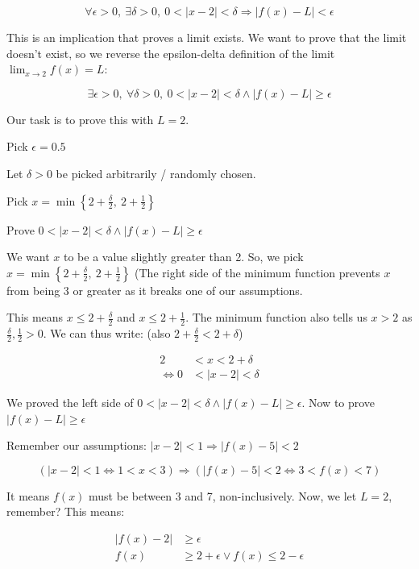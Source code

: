\documentclass[12pt]{article}
\theoremstyle{plain}
\theoremstyle{remark}
\theoremstyle{definition}
\begin{document}
\[\forall\epsilon > 0,\ \exists\delta > 0,\ 0 < |x - 2| < \delta \Rightarrow \left| f(x) - L \right| < \epsilon\]

This is an implication that proves a limit exists. We want to prove that
the limit doesn't exist, so we reverse the epsilon-delta definition of
the limit \(\lim_{x \rightarrow 2}{f(x) = L}\):

\[\exists\epsilon > 0,\ \forall\delta > 0,\ 0 < |x - 2| < \delta \land \left| f(x) - L \right| \geq \epsilon\]

Our task is to prove this with \(L = 2\).

Pick \(\epsilon = 0.5\)

Let \(\delta > 0\) be picked arbitrarily / randomly chosen.

Pick \(x = \min\left\{ 2 + \frac{\delta}{2},\ 2 + \frac{1}{2} \right\}\)

Prove
\(0 < |x - 2| < \delta \land \left| f(x) - L \right| \geq \epsilon\)

We want \(x\) to be a value slightly greater than 2. So, we pick
\(x = \min\left\{ 2 + \frac{\delta}{2},\ 2 + \frac{1}{2} \right\}\) (The
right side of the minimum function prevents \(x\) from being 3 or
greater as it breaks one of our assumptions.

This means \(x \leq 2 + \frac{\delta}{2}\) and
\(x \leq 2 + \frac{1}{2}\). The minimum function also tells us \(x > 2\)
as \(\frac{\delta}{2},\frac{1}{2} > 0\). We can thus write: (also
\(2 + \frac{\delta}{2} < 2 + \delta\))

\begin{align*}
2 &< x < 2 + \delta \\
\Leftrightarrow 0 &< |x - 2| < \delta
\end{align*}


We proved the left side of
\(0 < |x - 2| < \delta \land \left| f(x) - L \right| \geq \epsilon\).
Now to prove \(\left| f(x) - L \right| \geq \epsilon\)

Remember our assumptions:
\(|x - 2| < 1 \Rightarrow \left| f(x) - 5 \right| < 2\)

\[(|x - 2| < 1 \Leftrightarrow 1 < x < 3) \Rightarrow \left( \left| f(x) - 5 \right| < 2 \Leftrightarrow 3 < f(x) < 7 \right)\]

It means \(f(x)\) must be between 3 and 7, non-inclusively. Now, we let
\(L = 2\), remember? This means:

\begin{align*}
\left| f(x) - 2 \right| &\geq \epsilon \\
f(x) &\geq 2 + \epsilon \vee f(x) \leq 2 - \epsilon
\end{align*}
\end{document}

